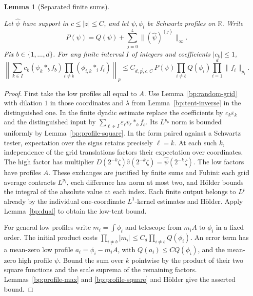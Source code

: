 \documentclass[11pt,letterpaper]{article}
\newtheorem{lemma}[theorem]{Lemma}
\theoremstyle{definition}
\newcommand{\R}{\mathbb R}
\providecommand{\lean}[1]{}
\providecommand{\uses}[1]{}
\begin{document}
\begin{lemma}[Separated finite sums]\label{bp:separated-cone}
\lean{TwistedParaproduct.separatedCone}
Let \(\widehat\psi\) have support in \(c\le |z|\le C\), and let
\(\psi,\phi_i\) be Schwartz profiles on \(\R\). Write
\[
 P(\psi)=Q(\psi)+\sum_{j=0}^4\|(\widehat\psi)^{(j)}\|_\infty .
\]
Fix \(b\in\{1,\ldots,d\}\). For any finite interval \(I\) of integers
and coefficients \(|c_k|\le1\),
\[
 \left\|\sum_{k\in I}c_k(\psi_k*_b f_b)
            \prod_{i\ne b}(\phi_{i,k}*_i f_i)\right\|_p
 \le C_{d,\vec p,c,C}\,P(\psi)\prod_{i\ne b}Q(\phi_i)
                             \prod_{i=1}^d\|f_i\|_{p_i}.
\]
\end{lemma}
\begin{proof}
\uses{bp:random-grid,bp:tent-inverse,bp:profile-square,bp:dual,bp:profile-max,bp:dyadic}
First take the low profiles all equal to \(A\). Use
Lemma~\ref{bp:random-grid} with dilation \(1\) in those coordinates
and \(\lambda\) from Lemma~\ref{bp:tent-inverse} in the distinguished one.
In the finite dyadic estimate replace the coefficients by
\(c_k\varepsilon_k\) and the distinguished input by
\(\sum_{\ell\in I}\varepsilon_\ell v_\ell*_b f_b\). Its
\(L^{p_b}\) norm is bounded uniformly by Lemma~\ref{bp:profile-square}.
In the form paired against a Schwartz tester, expectation over the signs
retains precisely \(\ell=k\). At each such \(k\), independence of the
grid translations factors their expectation over coordinates. The high
factor has multiplier \(D(2^{-k}\zeta)\widehat v(2^{-k}\zeta)
=\widehat\psi(2^{-k}\zeta)\). The low factors have profiles \(A\).
These exchanges are justified by finite sums and Fubini: each grid
average contracts \(L^{p_i}\), each difference has norm at most two,
and H\"older bounds the integral of the absolute value at each index.
Each finite output belongs to \(L^p\) already by the individual
one-coordinate \(L^1\)-kernel estimates and H\"older. Apply
Lemma~\ref{bp:dual} to obtain the low-tent bound.

For general low profiles write \(m_i=\int\phi_i\) and telescope
from \(m_i A\) to \(\phi_i\) in a fixed order. The initial product
costs \(\prod_{i\ne b}|m_i|\le C_d\prod_{i\ne b}Q(\phi_i)\).
An error term has a mean-zero low profile
\(a_i=\phi_i-m_i A\), with \(Q(a_i)\le C Q(\phi_i)\), and the
mean-zero high profile \(\psi\). Bound the sum over \(k\) pointwise by
the product of their two square functions and the scale suprema of
the remaining factors. Lemmas~\ref{bp:profile-max} and
\ref{bp:profile-square} and H\"older give the asserted bound.
\end{proof}
\end{document}
